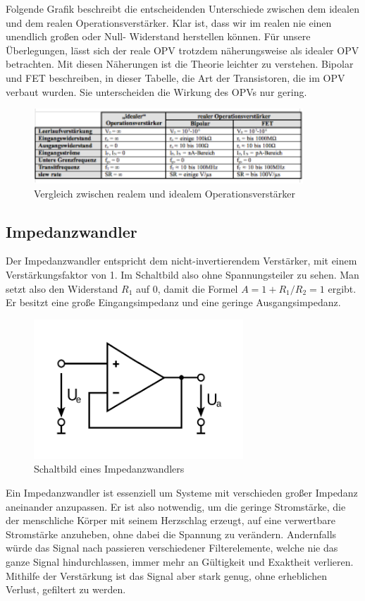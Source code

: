 Folgende Grafik beschreibt die entscheidenden Unterschiede zwischen dem idealen und dem realen Operationsverstärker.
Klar ist, dass wir im realen nie einen unendlich großen oder Null- Widerstand herstellen können. Für unsere Überlegungen, lässt sich der reale OPV trotzdem näherungsweise als idealer OPV betrachten. Mit diesen Näherungen ist die Theorie leichter zu verstehen. Bipolar und FET beschreiben, in dieser Tabelle, die Art der Transistoren, die im OPV verbaut wurden. Sie unterscheiden die Wirkung des OPVs nur gering.

\begin{figure}[H]
     \centering
     \includegraphics[width=0.9\textwidth]{Abb/vergl.pdf}
     \caption{Vergleich zwischen realem und idealem Operationsverstärker}
\end{figure}

\subsection{Impedanzwandler}

Der Impedanzwandler entspricht dem nicht-invertierendem Verstärker, mit einem Verstärkungsfaktor von 1. Im Schaltbild also ohne Spannungsteiler zu sehen. Man setzt also den Widerstand $R_1$ auf 0, damit die Formel $A= 1+ R_1/R_2 = 1$ ergibt. Er besitzt eine große Eingangsimpedanz und eine geringe Ausgangsimpedanz.
\begin{figure}[H]
     \centering
     \includegraphics[width=0.7\textwidth]{Abb/impconv.pdf}
     \caption{Schaltbild eines Impedanzwandlers}
\end{figure}
Ein Impedanzwandler ist essenziell um Systeme mit verschieden großer Impedanz aneinander anzupassen. Er ist also notwendig, um die geringe Stromstärke, die der menschliche Körper mit seinem Herzschlag erzeugt, auf eine verwertbare Stromstärke anzuheben, ohne dabei die Spannung zu verändern. Andernfalls würde das Signal nach passieren verschiedener Filterelemente, welche nie das ganze Signal hindurchlassen, immer mehr an Gültigkeit und Exaktheit verlieren. Mithilfe der Verstärkung ist das Signal aber stark genug, ohne erheblichen Verlust, gefiltert zu werden.


